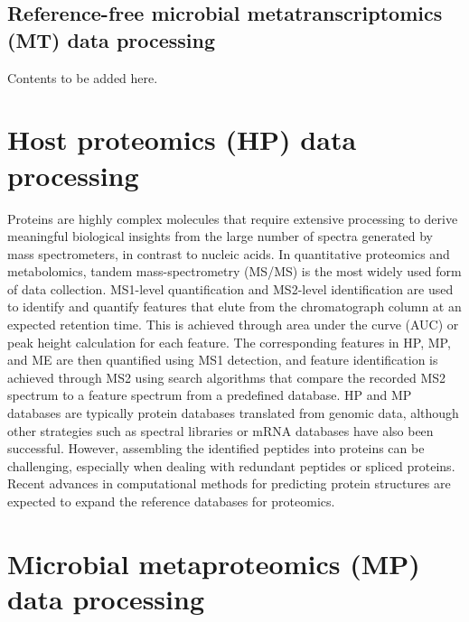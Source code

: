 \documentclass[
]{book}
\begin{document}
\normalsize

\hypertarget{microbial-metatranscriptomics-data-processing-reference-free}{%
\section{Reference-free microbial metatranscriptomics (MT) data processing}\label{microbial-metatranscriptomics-data-processing-reference-free}}

Contents to be added here.

\hypertarget{host-proteomics-data-processing}{%
\chapter{Host proteomics (HP) data processing}\label{host-proteomics-data-processing}}

Proteins are highly complex molecules that require extensive processing to derive meaningful biological insights from the large number of spectra generated by mass spectrometers, in contrast to nucleic acids. In quantitative proteomics and metabolomics, tandem mass-spectrometry (MS/MS) is the most widely used form of data collection. MS1-level quantification and MS2-level identification are used to identify and quantify features that elute from the chromatograph column at an expected retention time. This is achieved through area under the curve (AUC) or peak height calculation for each feature. The corresponding features in HP, MP, and ME are then quantified using MS1 detection, and feature identification is achieved through MS2 using search algorithms that compare the recorded MS2 spectrum to a feature spectrum from a predefined database. HP and MP databases are typically protein databases translated from genomic data, although other strategies such as spectral libraries or mRNA databases have also been successful. However, assembling the identified peptides into proteins can be challenging, especially when dealing with redundant peptides or spliced proteins. Recent advances in computational methods for predicting protein structures are expected to expand the reference databases for proteomics.

\hypertarget{microbial-metaproteomics-data-processing}{%
\chapter{Microbial metaproteomics (MP) data processing}\label{microbial-metaproteomics-data-processing}}
\end{document}
